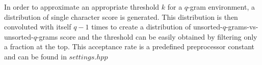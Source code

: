 In order to approximate an appropriate threshold $k$ for a $q$-gram environment, a distribution of single character score is generated. This distribution is then convoluted with itself $q-1$ times to create a distribution of unsorted-$q$-grams-vs-unsorted-$q$-grams score and the threshold can be easily obtained by filtering only a fraction at the top. This acceptance rate is a predefined preprocessor constant and can be found in $settings.hpp$